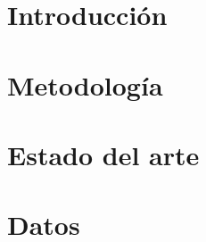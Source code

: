 \documentclass[12pt]{report}
\begin{document}
\chapter{Introducción}

\chapter{Metodología}

\chapter{Estado del arte}

\chapter{Datos}

%
%
\clearpage


\begin{thebibliography}{}



\bibitem{} 


\end{thebibliography}
\end{document}
